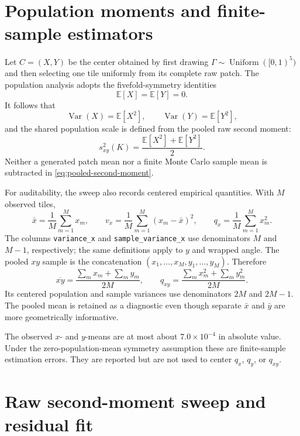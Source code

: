 \documentclass[11pt]{article}
\newcommand{\E}{\mathbb{E}}
\newcommand{\Var}{\operatorname{Var}}
\begin{document}
\section{Population moments and finite-sample estimators}

Let \(C=(X,Y)\) be the center obtained by first drawing
\(\Gamma\sim\operatorname{Uniform}([0,1)^5)\) and then selecting one tile
uniformly from its complete raw patch.  The population analysis adopts the
fivefold-symmetry identities
\[
  \E[X]=\E[Y]=0.
\]
It follows that
\[
  \Var(X)=\E[X^2],\qquad
  \Var(Y)=\E[Y^2],
\]
and the shared population scale is defined from the pooled raw second moment:
\begin{equation}
  s_{xy}^2(K)
  =
  \frac{\E[X^2]+\E[Y^2]}{2}.
  \label{eq:pooled-second-moment}
\end{equation}
Neither a generated patch mean nor a finite Monte Carlo sample mean is
subtracted in \eqref{eq:pooled-second-moment}.

For auditability, the sweep also records centered empirical quantities.  With
\(M\) observed tiles,
\[
  \bar x=\frac1M\sum_{m=1}^M x_m,\qquad
  v_x=\frac1M\sum_{m=1}^M(x_m-\bar x)^2,\qquad
  q_x=\frac1M\sum_{m=1}^M x_m^2.
\]
The columns \texttt{variance\_x} and \texttt{sample\_variance\_x} use
denominators \(M\) and \(M-1\), respectively; the same definitions apply to
\(y\) and wrapped angle.  The pooled \(xy\) sample is the concatenation
\((x_1,\ldots,x_M,y_1,\ldots,y_M)\).  Therefore
\[
  \overline{xy}
  =\frac{\sum_m x_m+\sum_m y_m}{2M},
  \qquad
  q_{xy}
  =\frac{\sum_m x_m^2+\sum_m y_m^2}{2M}.
\]
Its centered population and sample variances use denominators \(2M\) and
\(2M-1\).  The pooled mean is retained as a diagnostic even though separate
\(\bar x\) and \(\bar y\) are more geometrically informative.

The observed \(x\)- and \(y\)-means are at most about \(7.0\times10^{-4}\) in
absolute value.  Under the zero-population-mean symmetry assumption these are
finite-sample estimation errors.  They are reported but are not used to
center \(q_x\), \(q_y\), or \(q_{xy}\).

\section{Raw second-moment sweep and residual fit}
\end{document}
